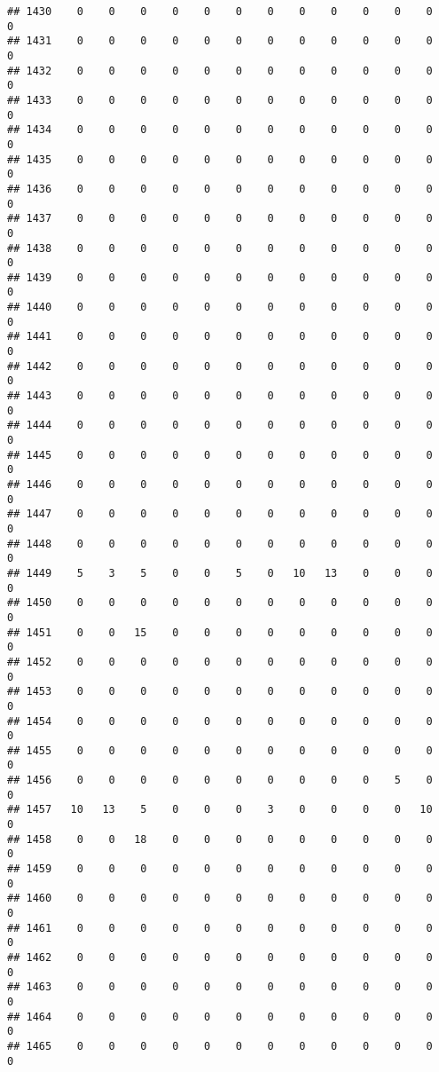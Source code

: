 \documentclass[]{article}
\begin{document}
\begin{verbatim}
## 1430    0    0    0    0    0    0    0    0    0    0    0    0    0
## 1431    0    0    0    0    0    0    0    0    0    0    0    0    0
## 1432    0    0    0    0    0    0    0    0    0    0    0    0    0
## 1433    0    0    0    0    0    0    0    0    0    0    0    0    0
## 1434    0    0    0    0    0    0    0    0    0    0    0    0    0
## 1435    0    0    0    0    0    0    0    0    0    0    0    0    0
## 1436    0    0    0    0    0    0    0    0    0    0    0    0    0
## 1437    0    0    0    0    0    0    0    0    0    0    0    0    0
## 1438    0    0    0    0    0    0    0    0    0    0    0    0    0
## 1439    0    0    0    0    0    0    0    0    0    0    0    0    0
## 1440    0    0    0    0    0    0    0    0    0    0    0    0    0
## 1441    0    0    0    0    0    0    0    0    0    0    0    0    0
## 1442    0    0    0    0    0    0    0    0    0    0    0    0    0
## 1443    0    0    0    0    0    0    0    0    0    0    0    0    0
## 1444    0    0    0    0    0    0    0    0    0    0    0    0    0
## 1445    0    0    0    0    0    0    0    0    0    0    0    0    0
## 1446    0    0    0    0    0    0    0    0    0    0    0    0    0
## 1447    0    0    0    0    0    0    0    0    0    0    0    0    0
## 1448    0    0    0    0    0    0    0    0    0    0    0    0    0
## 1449    5    3    5    0    0    5    0   10   13    0    0    0    0
## 1450    0    0    0    0    0    0    0    0    0    0    0    0    0
## 1451    0    0   15    0    0    0    0    0    0    0    0    0    0
## 1452    0    0    0    0    0    0    0    0    0    0    0    0    0
## 1453    0    0    0    0    0    0    0    0    0    0    0    0    0
## 1454    0    0    0    0    0    0    0    0    0    0    0    0    0
## 1455    0    0    0    0    0    0    0    0    0    0    0    0    0
## 1456    0    0    0    0    0    0    0    0    0    0    5    0    0
## 1457   10   13    5    0    0    0    3    0    0    0    0   10    0
## 1458    0    0   18    0    0    0    0    0    0    0    0    0    0
## 1459    0    0    0    0    0    0    0    0    0    0    0    0    0
## 1460    0    0    0    0    0    0    0    0    0    0    0    0    0
## 1461    0    0    0    0    0    0    0    0    0    0    0    0    0
## 1462    0    0    0    0    0    0    0    0    0    0    0    0    0
## 1463    0    0    0    0    0    0    0    0    0    0    0    0    0
## 1464    0    0    0    0    0    0    0    0    0    0    0    0    0
## 1465    0    0    0    0    0    0    0    0    0    0    0    0    0

\end{verbatim}
\end{document}
